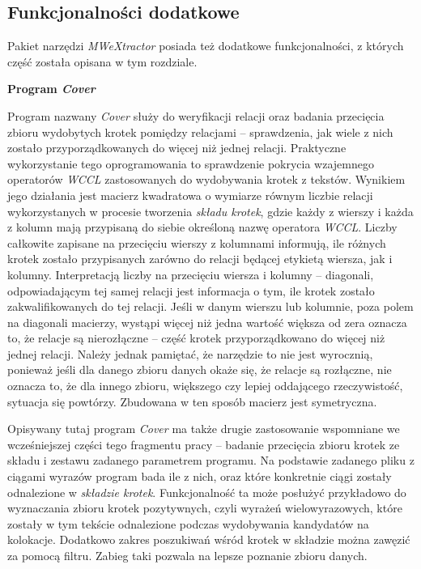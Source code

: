 \subsection{Funkcjonalności dodatkowe}
Pakiet narzędzi \emph{MWeXtractor} posiada też dodatkowe funkcjonalności, z których część została opisana w tym rozdziale.

\par
\noindent\textbf{Program \textit{Cover}}
\par
Program nazwany \emph{Cover} służy do weryfikacji relacji oraz badania przecięcia zbioru wydobytych krotek pomiędzy relacjami -- sprawdzenia, jak wiele z nich zostało przyporządkowanych do więcej niż jednej relacji.
Praktyczne wykorzystanie tego oprogramowania to sprawdzenie pokrycia wzajemnego operatorów \emph{WCCL} zastosowanych do wydobywania krotek z tekstów.
Wynikiem jego działania jest macierz kwadratowa o wymiarze równym liczbie relacji wykorzystanych w procesie tworzenia \emph{składu krotek}, gdzie każdy z wierszy i każda z kolumn mają przypisaną do siebie określoną nazwę operatora \emph{WCCL}.
Liczby całkowite zapisane na przecięciu wierszy z kolumnami informują, ile różnych krotek zostało przypisanych zarówno do relacji będącej etykietą wiersza, jak i kolumny.
Interpretacją liczby na przecięciu wiersza i kolumny -- diagonali, odpowiadającym tej samej relacji jest informacja o tym, ile krotek zostało zakwalifikowanych do tej relacji.
Jeśli w danym wierszu lub kolumnie, poza polem na diagonali macierzy, wystąpi więcej niż jedna wartość większa od zera  oznacza to, że relacje są nierozłączne -- część krotek przyporządkowano do więcej niż jednej relacji.
Należy jednak pamiętać, że narzędzie to nie jest wyrocznią, ponieważ jeśli dla danego zbioru danych okaże się, że relacje są rozłączne, nie oznacza to, że dla innego zbioru, większego czy lepiej oddającego rzeczywistość, sytuacja się powtórzy.
Zbudowana w ten sposób macierz jest symetryczna.
\par
Opisywany tutaj program \emph{Cover} ma także drugie zastosowanie wspomniane we wcześniejszej części tego fragmentu pracy -- badanie przecięcia zbioru krotek ze składu i zestawu zadanego parametrem programu.
Na podstawie zadanego pliku z ciągami wyrazów program bada ile z nich, oraz które konkretnie ciągi zostały odnalezione w \emph{składzie krotek}.
Funkcjonalność ta może posłużyć przykładowo do wyznaczania zbioru krotek pozytywnych, czyli wyrażeń wielowyrazowych, które zostały w tym tekście odnalezione podczas wydobywania kandydatów na kolokacje.
Dodatkowo zakres poszukiwań wśród krotek w składzie można zawęzić za pomocą filtru.
Zabieg taki pozwala na lepsze poznanie zbioru danych.

